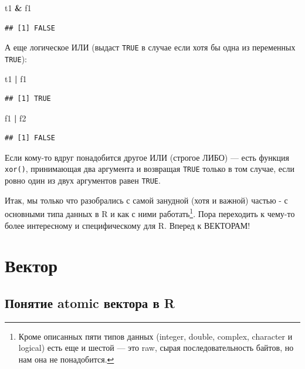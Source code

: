 \documentclass[]{book}
\newenvironment{Shaded}{\begin{snugshade}}{\end{snugshade}}
\newcommand{\StringTok}[1]{\textcolor[rgb]{0.31,0.60,0.02}{#1}}
\newcommand{\OperatorTok}[1]{\textcolor[rgb]{0.81,0.36,0.00}{\textbf{#1}}}
\newcommand{\NormalTok}[1]{#1}
\begin{document}
\begin{Shaded}
\begin{Highlighting}[]
\NormalTok{t1 }\OperatorTok{&}\StringTok{ }\NormalTok{f1}
\end{Highlighting}
\end{Shaded}

\begin{verbatim}
## [1] FALSE
\end{verbatim}

А еще логическое ИЛИ (выдаст \texttt{TRUE} в случае если хотя бы одна из
переменных \texttt{TRUE}):

\begin{Shaded}
\begin{Highlighting}[]
\NormalTok{t1 }\OperatorTok{|}\StringTok{ }\NormalTok{f1}
\end{Highlighting}
\end{Shaded}

\begin{verbatim}
## [1] TRUE
\end{verbatim}

\begin{Shaded}
\begin{Highlighting}[]
\NormalTok{f1 }\OperatorTok{|}\StringTok{ }\NormalTok{f2}
\end{Highlighting}
\end{Shaded}

\begin{verbatim}
## [1] FALSE
\end{verbatim}

Если кому-то вдруг понадобится другое ИЛИ (строгое ЛИБО) --- есть
функция \texttt{xor()}, принимающая два аргумента и возвращая
\texttt{TRUE} только в том случае, если ровно один из двух аргументов
равен \texttt{TRUE}.

Итак, мы только что разобрались с самой занудной (хотя и важной) частью
- с основными типа данных в R и как с ними работать\footnote{Кроме
  описанных пяти типов данных (integer, double, complex, character и
  logical) есть еще и шестой --- это raw, сырая последовательность
  байтов, но нам она не понадобится.}. Пора переходить к чему-то более
интересному и специфическому для R. Вперед к ВЕКТОРАМ!

\chapter{Вектор}\label{vector}

\section{Понятие atomic вектора в R}\label{atomic}
\end{document}
